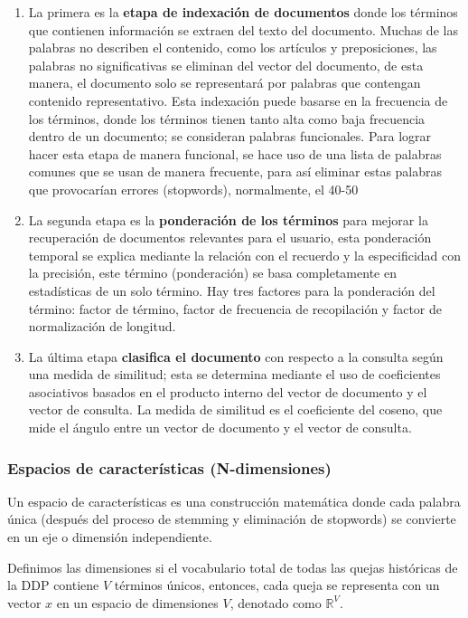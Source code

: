 \begin{enumerate}
\item La primera es la \textbf{etapa de indexación de documentos} donde los términos que contienen información se extraen del texto del documento. Muchas de las palabras no describen el contenido, como los artículos y preposiciones, las palabras no significativas se eliminan del vector del documento, de esta manera, el documento solo se representará por palabras que contengan contenido representativo. Esta indexación puede basarse en la frecuencia de los términos, donde los términos tienen tanto alta como baja frecuencia dentro de un documento; se consideran palabras funcionales. Para lograr hacer esta etapa de manera funcional, se hace uso de una lista de palabras comunes que se usan de manera frecuente, para así eliminar estas palabras que provocarían errores (stopwords), normalmente, el 40-50%
\item La segunda etapa es la \textbf{ponderación de los términos} para mejorar la recuperación de documentos relevantes para el usuario, esta ponderación temporal se explica mediante la relación con el recuerdo y la especificidad con la precisión, este término (ponderación) se basa completamente en estadísticas de un solo término. Hay tres factores para la ponderación del término: factor de término, factor de frecuencia de recopilación y factor de normalización de longitud.
\item La última etapa \textbf{clasifica el documento} con respecto a la consulta según una medida de similitud; esta se determina mediante el uso de coeficientes asociativos basados en el producto interno del vector de documento y el vector de consulta. La medida de similitud es el coeficiente del coseno, que mide el ángulo entre un vector de documento y el vector de consulta.
\end{enumerate}

\subsubsection{Espacios de características (N-dimensiones)}

Un espacio de características es una construcción matemática donde cada palabra única (después del proceso de stemming y eliminación de stopwords) se convierte en un eje o dimensión independiente.

Definimos las dimensiones si el vocabulario total de todas las quejas históricas de la DDP contiene $V$ términos únicos, entonces, cada queja se representa con un vector $x$ en un espacio de dimensiones $V$, denotado como $\mathbb{R}^V$.

